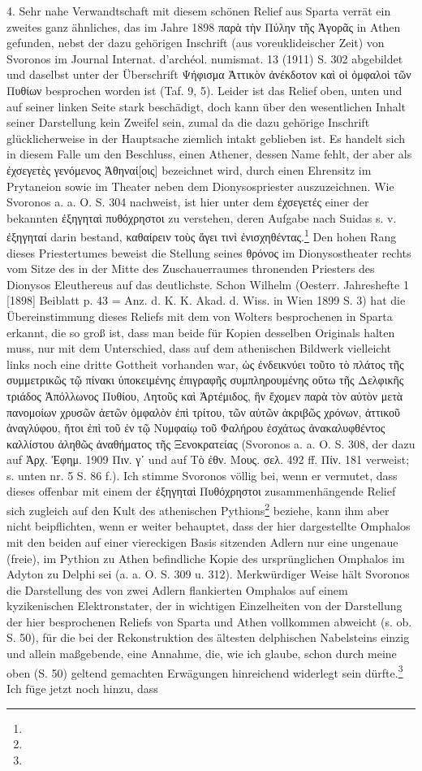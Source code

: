 \documentclass[a4paper, 11pt, oneside]{article}
\begin{document}
4. Sehr nahe Verwandtschaft mit diesem schönen Relief aus Sparta verrät ein zweites ganz ähnliches, das im Jahre 1898 παρὰ τὴν Πύλην τῆς Ἀγορᾶς in Athen gefunden, nebst der dazu gehörigen Inschrift (aus voreuklideischer Zeit) von Svoronos im Journal Internat. d'archéol. numismat. 13 (1911) S. 302 abgebildet und daselbst unter der Überschrift Ψήφισμα Ἀττικὸν ἀνέκδοτον καὶ οἱ ὀμφαλοὶ τῶν Πυθίων besprochen worden ist (Taf. 9, 5). Leider ist das Relief oben, unten und auf seiner linken Seite stark beschädigt, doch kann über den wesentlichen Inhalt seiner Darstellung kein Zweifel sein, zumal da die dazu gehörige Inschrift glücklicherweise in der Hauptsache ziemlich intakt geblieben ist. Es handelt sich in diesem Falle um den Beschluss, einen Athener, dessen Name fehlt, der aber als ἐχσεγετὲς γενόμενος Ἀθηναί[οις] bezeichnet wird, durch einen Ehrensitz im Prytaneion sowie im Theater neben dem Dionysospriester auszuzeichnen. Wie Svoronos a. a. O. S. 304 nachweist, ist hier unter dem ἐχσεγετές einer der bekannten ἐξηγηταὶ πυθόχρηστοι zu verstehen, deren Aufgabe nach Suidas s. v. ἐξηγηταί darin bestand, καθαίρειν τοὺς ἄγει τινὶ ἐνισχηθέντας.\footnote{} Den hohen Rang dieses Priestertumes beweist die Stellung seines θρόνος im Dionysostheater rechts vom Sitze des in der Mitte des Zuschauerraumes thronenden Priesters des Dionysos Eleuthereus auf das deutlichste. Schon Wilhelm (Oesterr. Jahreshefte 1 [1898] Beiblatt p. 43 = Anz. d. K. K. Akad. d. Wiss. in Wien 1899 S. 3) hat die Übereinstimmung dieses Reliefs mit dem von Wolters besprochenen in Sparta erkannt, die so groß ist, dass man beide für Kopien desselben Originals halten muss, nur mit dem Unterschied, dass auf dem athenischen Bildwerk vielleicht links noch eine dritte Gottheit vorhanden war, ὡς ἐνδεικνύει τοῦτο τὸ πλάτος τῆς συμμετρικῶς τῷ πίνακι ὑποκειμένης ἐπιγραφῆς συμπληρουμένης οὕτω τῆς Δελφικῆς τριάδος Ἀπόλλωνος Πυθίου, Λητοῦς καὶ Ἀρτέμιδος, ἣν ἔχομεν παρὰ τὸν αὐτὸν μετὰ πανομοίων χρυσῶν ἀετῶν ὀμφαλὸν ἐπὶ τρίτου, τῶν αὐτῶν ἀκριβῶς χρόνων, ἀττικοῦ ἀναγλύφου, ἤτοι ἐπὶ τοῦ ἐν τῷ Νυμφαίῳ τοῦ Φαλήρου ἐσχάτως ἀνακαλυφθέντος καλλίστου ἀληθῶς ἀναθήματος τῆς Ξενοκρατείας (Svoronos a. a. O. S. 308, der dazu auf Ἀρχ. Ἐφημ. 1909 Πιν. γʹ und auf Τὸ ἐθν. Μους. σελ. 492 ff. Πίν. 181 verweist; s. unten nr. 5 S. 86 f.). Ich stimme Svoronos völlig bei, wenn er vermutet, dass dieses offenbar mit einem der ἐξηγηταὶ Πυθόχρηστοι zusammenhängende Relief sich zugleich auf den Kult des athenischen Pythions\footnote{} beziehe, kann ihm aber nicht beipflichten, wenn er weiter behauptet, dass der hier dargestellte Omphalos mit den beiden auf einer viereckigen Basis sitzenden Adlern nur eine ungenaue (freie), im Pythion zu Athen befindliche Kopie des ursprünglichen Omphalos im Adyton zu Delphi sei (a. a. O. S. 309 u. 312). Merkwürdiger Weise hält Svoronos die Darstellung des von zwei Adlern flankierten Omphalos auf einem kyzikenischen Elektronstater, der in wichtigen Einzelheiten von der Darstellung der hier besprochenen Reliefs von Sparta und Athen vollkommen abweicht (s. ob. S. 50), für die bei der Rekonstruktion des ältesten delphischen Nabelsteins einzig und allein maßgebende, eine Annahme, die, wie ich glaube, schon durch meine oben (S. 50) geltend gemachten Erwägungen hinreichend widerlegt sein dürfte.\footnote{} Ich füge jetzt noch hinzu, dass 
\end{document}
